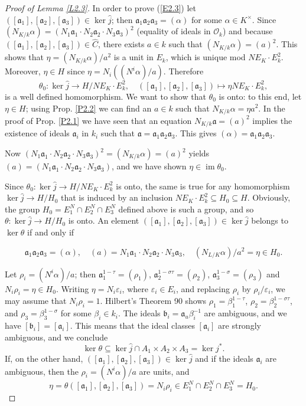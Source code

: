 \documentclass{amsart}
\newcommand{\fa}{{\mathfrak a}}
\newcommand{\fb}{{\mathfrak b}}
\newcommand{\eps}{\varepsilon}
\newcommand{\OO}{{\mathcal O}}
\newcommand{\hj}{\widehat{j}}
\newcommand{\hC}{\widehat{C}}
\newcommand{\too}{\longmapsto}
\newcommand{\lra}{\longrightarrow}
\newcommand{\im}{\operatorname{im}}
\begin{document}
\begin{proof}[Proof of Lemma \ref{L2.3}]

In order to prove (\ref{E2.3}) let
$([\fa_1], [\fa_2], [\fa_3]) \in \ker \hj$; then
$\fa_1\fa_2\fa_3 = (\alpha)$ for some $\alpha \in K^\times$.
Since $(N_{K/k} \alpha) = (N_1\fa_1 \cdot N_2 \fa_2 \cdot
N_3 \fa_3)^2$ (equality of ideals in $\OO_k$) and because
$([\fa_1], [\fa_2], [\fa_3]) \in \hC$, there exists
$a \in k$ such that $(N_{K/k} \alpha) = (a)^2$. This shows
that $\eta = (N_{K/k} \alpha)/a^2$ is a unit in $E_k$, which
is unique mod $NE_K \cdot E_k^2$. Moreover, $\eta \in H$ since
$\eta = N_i((N^i \alpha)/a)$. Therefore
$$ \theta_0: \ker \hj \lra H/NE_K \cdot E_k^2, \quad
   ([\fa_1], [\fa_2], [\fa_3]) \too \eta NE_K \cdot E_k^2,$$
is a well defined homomorphism. We want to show that $\theta_0$
is onto: to this end, let $\eta \in H$; using Prop. \ref{P2.2} we
can find an $a \in k$ such that $N_{K/k}\alpha = \eta a^2$. In
the proof of Prop. \ref{P2.1} we have seen that an equation
$N_{K/k} \fa = (a)^2$ implies the existence of ideals $\fa_i$
in $k_i$ such that $\fa = \fa_1\fa_2\fa_3$. This gives
$(\alpha) = \fa_1\fa_2\fa_3$.

Now $(N_1\fa_1 \cdot N_2\fa_2 \cdot N_3\fa_3)^2 =
  (N_{K/k} \alpha) = (a)^2$ yields
$(a) = (N_1\fa_1 \cdot N_2\fa_2 \cdot N_3\fa_3)$, and
we have shown $\eta \in \im \theta_0$.

Since $\theta_0: \ker \hj \lra H/NE_K \cdot E_k^2$
is onto, the same is true for any homomorphism
$\ker \hj \lra H/H_0$ that is induced by an inclusion
$NE_K \cdot E_k^2 \subseteq H_0 \subseteq H$. Obviously,
the group $H_0 = E_1^N \cap E_2^N \cap E_3^N$ defined above
is such a group, and so $\theta: \ker \hj \lra H/H_0$ is onto.
An element $([\fa_1], [\fa_2], [\fa_3]) \in \ker \hj$ belongs
to $\ker \theta$ if and only if

$$ \fa_1\fa_2\fa_3 = (\alpha),  \quad
   (a) = N_1\fa_1 \cdot N_2\fa_2 \cdot N_3\fa_3, \quad
    (N_{L/K} \alpha)/a^2 = \eta \in H_0. $$

Let $\rho_i = (N^i\alpha)/a$; then $\fa_1^{1-\tau} = (\rho_1)$,
$\fa_2^{1-\sigma\tau} = (\rho_2)$, $\fa_3^{1-\sigma} = (\rho_3)$
and $N_i\rho_i = \eta \in H_0$. Writing $\eta = N_i\eps_i$,
where $\eps_i \in E_i$, and replacing $\rho_i$ by $\rho_i/\eps_i$,
we may assume that $N_i\rho_i = 1$. Hilbert's Theorem 90 shows
$\rho_1 = \beta_1^{1-\tau}$, $\rho_2 = \beta_2^{1-\sigma\tau}$,
and $\rho_3 = \beta_3^{1-\sigma}$ for some $\beta_i \in k_i$.
The ideals $\fb_i = \fa_u \beta_i^{-1}$ are ambiguous, and we
have $[\fb_i] = [\fa_i]$. This means that the ideal classes
$[\fa_i]$ are strongly ambiguous, and we conclude
$$ \ker \theta \subseteq
   \ker \hj \cap A_1 \times A_2 \times A_3 = \ker j^*. $$
If, on the other hand, $([\fa_1], [\fa_2], [\fa_3]) \in \ker \hj$
and if the ideals $\fa_i$ are ambiguous, then the
$\rho_i = (N^i \alpha)/a$ are units, and
$$ \eta = \theta([\fa_1], [\fa_2], [\fa_3]) = N_i\rho_i
   \in E_1^N \cap E_2^N \cap E_3^N = H_0. $$


\end{proof}
\end{document}
